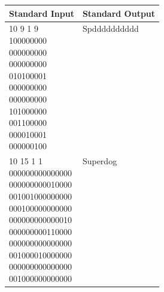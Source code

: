 \begin{table}[H]
\begin{tabularx}{\textwidth}{|X|X|}
    \hline
    \textbf{Standard Input} & \textbf{Standard Output} \\ 
    \hline 
    \tablecell{
        10 9 1 9 \\
        100000000 \\
        000000000 \\
        000000000 \\
        010100001 \\
        000000000 \\
        000000000 \\
        101000000 \\
        001100000 \\
        000010001 \\
        000000100 \\
    } & 
    \tablecell{Spdddddddddd \\ \\ \\ \\ \\ \\ \\ \\ \\ \\ \\} \\
    \hline
    \tablecell{
        10 15 1 1 \\
        000000000000000 \\
        000000000010000 \\
        001001000000000 \\
        000100000000000 \\
        000000000000010 \\
        000000000110000 \\
        000000000000000 \\
        001000010000000 \\
        000000000000000 \\
        001000000000000 \\
    } & \tablecell{
        Superdog \\ \\ \\ \\ \\ \\ \\ \\ \\ \\ \\
    } \\
    \hline
\end{tabularx}
\end{table}

